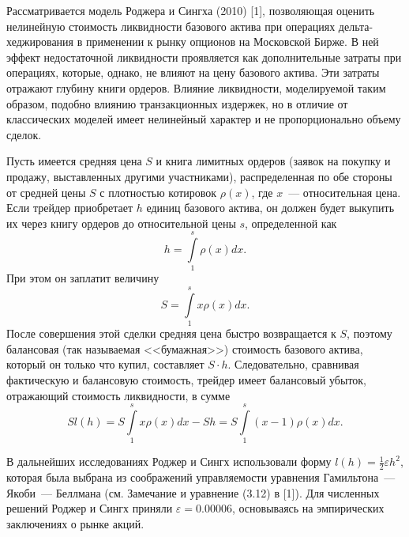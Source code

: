 \vzmscaption

Рассматривается модель Роджера и Сингха (2010) [1], позволяющая оценить нелинейную стоимость ликвидности базового актива при операциях дельта-хеджирования в применении к рынку опционов на Московской Бирже.
В ней эффект недостаточной ликвидности проявляется как дополнительные затраты при операциях, которые, однако, не влияют на цену базового актива. Эти затраты отражают глубину книги ордеров. Влияние ликвидности, моделируемой таким образом, подобно влиянию транзакционных издержек, но в отличие от классических моделей имеет нелинейный характер и не пропорционально объему сделок.

Пусть имеется средняя цена $S$ и книга лимитных ордеров (заявок на покупку и продажу, выставленных другими участниками), распределенная по обе стороны от средней цены $S$ с плотностью котировок $\rho(x)$, где $x$~--- относительная цена. Если трейдер приобретает $h$ единиц базового актива, он должен будет выкупить их через книгу ордеров до относительной цены $s$, определенной как
\begin{equation*}
h = \int\limits_1^s \rho(x)dx.
\end{equation*}
При этом он заплатит величину
\begin{equation*}
S=\int\limits_1^s x \rho(x) dx.
\end{equation*}
После совершения этой сделки средняя цена быстро возвращается к $S$, поэтому балансовая (так называемая <<бумажная>>) стоимость базового актива, который он только что купил, составляет $S \cdot h$. Следовательно, сравнивая фактическую и балансовую стоимость, трейдер имеет балансовый убыток, отражающий стоимость ликвидности, в сумме
\begin{equation*}
S l(h) = S \int\limits_1^s x \rho(x) dx - Sh = S \int\limits_1^s (x-1) \rho(x) dx.
\end{equation*}

В дальнейших исследованиях Роджер и Сингх использовали форму $l (h) = \frac12 \varepsilon h^2$, которая была выбрана из соображений управляемости уравнения Гамильтона~--- Якоби~--- Беллмана (см. Замечание и уравнение (3.12) в [1]). Для численных решений Роджер и Сингх приняли $\varepsilon = 0.00006$, основываясь на эмпирических заключениях о рынке акций.

